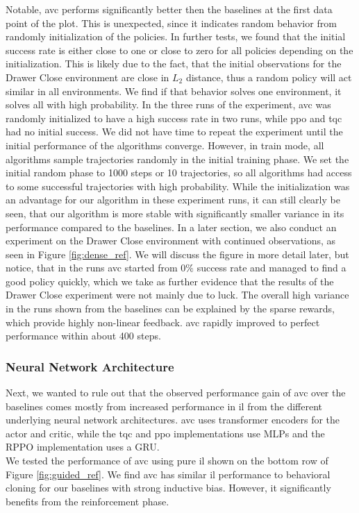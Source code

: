 Notable, \ac{avc} performs significantly better then the baselines at the first data point of the plot. This is unexpected, since it indicates 
random behavior from randomly initialization of the policies. In further tests, we found that the initial success rate is either close to one or close to zero for all policies depending 
on the initialization. This is likely 
due to the fact, that the initial observations for the Drawer Close environment are close in $L_2$ distance, thus a random policy will act similar in all environments. We find if that behavior 
solves one environment, it solves all with high probability. In the three runs of the experiment, \ac{avc} was randomly initialized to have a high success rate in two runs, while \ac{ppo} and \ac{tqc} had no 
initial success. We did not have time to repeat the experiment until the initial performance of the algorithms converge. However, in train mode, 
all algorithms sample trajectories randomly in the initial training phase. 
We set the initial random phase to 1000 steps or 10 trajectories, so all algorithms had access to some successful trajectories with high probability. While the initialization was an advantage 
for our algorithm in these experiment runs, it can still clearly be seen, that our algorithm is more stable with significantly smaller variance in its performance compared to the baselines. In a later 
section, we also conduct an experiment on the Drawer Close environment with continued observations, as seen in Figure \ref{fig:dense_ref}. We will discuss the figure in more detail later, but 
notice, that in the runs \ac{avc} started from $0 \%$ success rate and managed to find a good policy quickly, which we take as further evidence that the results of the Drawer Close experiment were not 
mainly due to luck. The overall high variance in the runs shown from the baselines can be explained by the sparse rewards, which provide highly non-linear feedback. 
\ac{avc} rapidly improved to perfect performance within about 400 steps. \\

\subsubsection{Neural Network Architecture}
Next, we wanted to rule out that the observed performance gain of \ac{avc} over the baselines comes mostly from increased performance in \ac{il} 
from the different underlying neural network architectures. \ac{avc} uses transformer encoders for the actor and 
critic, while the \ac{tqc} and \ac{ppo} implementations use MLPs and the RPPO implementation uses a GRU.\\ 
We tested the performance of \ac{avc} using pure \ac{il} shown on the bottom row of
Figure \ref{fig:guided_ref}. We find \ac{avc} has similar \ac{il} performance to behavioral cloning for our baselines with strong inductive bias. However, it significantly benefits from the reinforcement phase.\\

